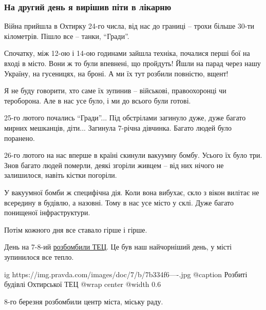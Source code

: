  
 
 
 
 

\subsubsection{На другий день я вирішив піти в лікарню}
\label{sec:30_03_2022.stz.news.ua.pravda.2.ohtyrka.3.likarnja}

Війна прийшла в Охтирку 24-го числа, від нас до границі – трохи більше 30-ти
кілометрів. Пішло все – танки, \enquote{Гради}.

Спочатку, між 12-ою і 14-ою годинами зайшла техніка, почалися перші бої на
вході в місто. Вони ж то були впевнені, що пройдуть! Йшли на парад через нашу
Україну, на гусеницях, на броні. А ми їх тут розбили повністю, вщент! 

Я не буду говорити, хто саме їх зупинив – військові, правоохоронці чи
тероборона. Але в нас усе було, і ми до всього були готові.

25-го лютого почались \enquote{Гради}... Під обстрілами загинуло дуже, дуже
багато мирних мешканців, діти... Загинула 7-річна дівчинка. Багато людей було
поранено.

26-го лютого на нас вперше в країні скинули вакуумну бомбу. Усього їх було три.
Знов багато людей померли, деякі згоріли живцем – від них нічого не залишилося,
навіть кістки погоріли. 


У вакуумної бомби ж специфічна дія. Коли вона вибухає, скло з вікон вилітає не
всередину в будівлю, а назовні. Тому в нас усе місто у склі. Дуже багато
понищеної інфраструктури. 

Потім кожного дня все ставало гірше і гірше.

День на 7-8-ий
\href{https://www.pravda.com.ua/news/2022/03/3/7327841/}{розбомбили ТЕЦ}. Це
був наш найчорніший день, у місті зупинилося все тепло.

\ifcmt
  ig https://img.pravda.com/images/doc/7/b/7b334f6----.jpg
	@caption Розбиті будівлі Охтирської ТЕЦ
  @wrap center
  @width 0.6
\fi

8-го березня розбомбили центр міста, міську раду.

